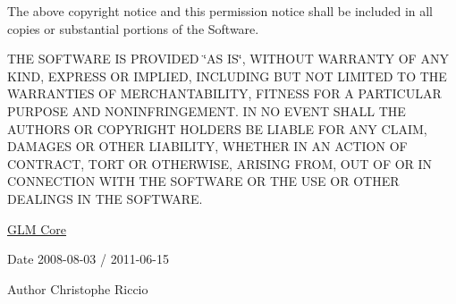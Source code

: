 \-The above copyright notice and this permission notice shall be included in all copies or substantial portions of the \-Software.

\-T\-H\-E \-S\-O\-F\-T\-W\-A\-R\-E \-I\-S \-P\-R\-O\-V\-I\-D\-E\-D \char`\"{}\-A\-S I\-S\char`\"{}, \-W\-I\-T\-H\-O\-U\-T \-W\-A\-R\-R\-A\-N\-T\-Y \-O\-F \-A\-N\-Y \-K\-I\-N\-D, \-E\-X\-P\-R\-E\-S\-S \-O\-R \-I\-M\-P\-L\-I\-E\-D, \-I\-N\-C\-L\-U\-D\-I\-N\-G \-B\-U\-T \-N\-O\-T \-L\-I\-M\-I\-T\-E\-D \-T\-O \-T\-H\-E \-W\-A\-R\-R\-A\-N\-T\-I\-E\-S \-O\-F \-M\-E\-R\-C\-H\-A\-N\-T\-A\-B\-I\-L\-I\-T\-Y, \-F\-I\-T\-N\-E\-S\-S \-F\-O\-R \-A \-P\-A\-R\-T\-I\-C\-U\-L\-A\-R \-P\-U\-R\-P\-O\-S\-E \-A\-N\-D \-N\-O\-N\-I\-N\-F\-R\-I\-N\-G\-E\-M\-E\-N\-T. \-I\-N \-N\-O \-E\-V\-E\-N\-T \-S\-H\-A\-L\-L \-T\-H\-E \-A\-U\-T\-H\-O\-R\-S \-O\-R \-C\-O\-P\-Y\-R\-I\-G\-H\-T \-H\-O\-L\-D\-E\-R\-S \-B\-E \-L\-I\-A\-B\-L\-E \-F\-O\-R \-A\-N\-Y \-C\-L\-A\-I\-M, \-D\-A\-M\-A\-G\-E\-S \-O\-R \-O\-T\-H\-E\-R \-L\-I\-A\-B\-I\-L\-I\-T\-Y, \-W\-H\-E\-T\-H\-E\-R \-I\-N \-A\-N \-A\-C\-T\-I\-O\-N \-O\-F \-C\-O\-N\-T\-R\-A\-C\-T, \-T\-O\-R\-T \-O\-R \-O\-T\-H\-E\-R\-W\-I\-S\-E, \-A\-R\-I\-S\-I\-N\-G \-F\-R\-O\-M, \-O\-U\-T \-O\-F \-O\-R \-I\-N \-C\-O\-N\-N\-E\-C\-T\-I\-O\-N \-W\-I\-T\-H \-T\-H\-E \-S\-O\-F\-T\-W\-A\-R\-E \-O\-R \-T\-H\-E \-U\-S\-E \-O\-R \-O\-T\-H\-E\-R \-D\-E\-A\-L\-I\-N\-G\-S \-I\-N \-T\-H\-E \-S\-O\-F\-T\-W\-A\-R\-E.

\hyperlink{group__core}{\-G\-L\-M \-Core}

\begin{DoxyDate}{\-Date}
2008-\/08-\/03 / 2011-\/06-\/15 
\end{DoxyDate}
\begin{DoxyAuthor}{\-Author}
\-Christophe \-Riccio 
\end{DoxyAuthor}
